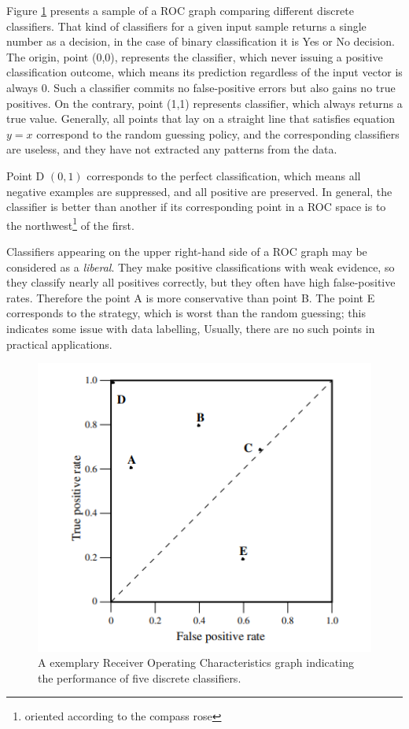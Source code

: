 Figure \ref{fig:ROC_eg} presents a sample of a ROC graph comparing different discrete classifiers. That kind of classifiers for a given input sample returns a single number as a decision, in the case of binary classification it is Yes or No decision. The origin, point (0,0), represents the classifier, which never issuing a positive classification outcome, which means its prediction regardless of the input vector is always 0. Such a classifier commits no false-positive errors but also gains no true positives. On the contrary, point (1,1) represents classifier, which always returns a true value. Generally, all points that lay on a straight line that satisfies equation $y=x$ correspond to the random guessing policy, and the corresponding classifiers are useless, and they have not extracted any patterns from the data.  

Point D $(0,1)$ corresponds to the perfect classification, which means all negative examples are suppressed, and all positive are preserved. In general, the classifier is better than another if its corresponding point in a ROC space is to the northwest\footnote{oriented according to the compass rose} of the first. 
% 

Classifiers appearing on the upper right-hand side of a ROC graph may be considered as a \textit{liberal}. They make positive classifications with weak evidence, so they classify nearly all positives correctly, but they often have high false-positive rates. Therefore the point A is more conservative than point B. The point E corresponds to the strategy, which is worst than the random guessing; this indicates some issue with data labelling, Usually, there are no such points in practical applications. 

\begin{figure}[!ht]
\centering
\includegraphics[scale=0.7]{figures/ExampleROC.PNG}
\caption{A exemplary Receiver Operating Characteristics graph indicating the performance of five discrete classifiers.
\label{fig:ROC_eg}}
\end{figure}

